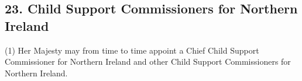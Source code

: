 \documentclass[12pt,a4paper]{article}
\begin{document}
%
%
%
%
%
%
%
%
%
%
%

\subsection{23. Child Support Commissioners for Northern Ireland}

(1) Her Majesty may from time to time
 appoint a Chief Child Support Commissioner for Northern Ireland and 
other Child Support Commissioners for Northern Ireland.  %
\end{document}
